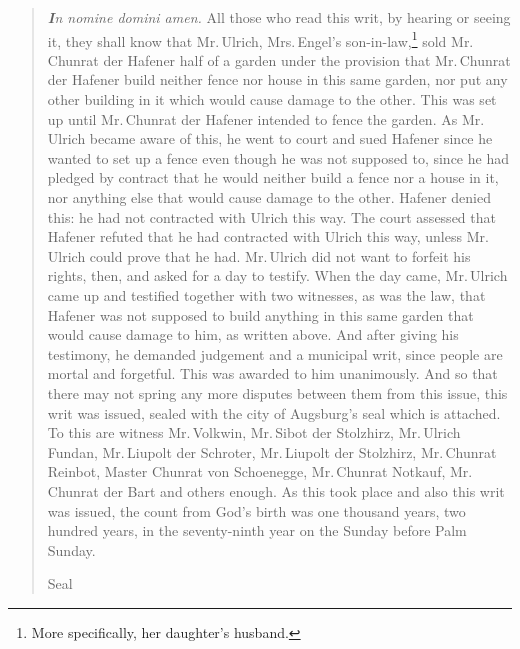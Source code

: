 \documentclass[12pt,paper=a4]{scrartcl}
\begin{document}
\blockquote{\emph{\textbf{I}n nomine domini amen.} All those who read this writ, by hearing or seeing it, they shall know that Mr.\,Ulrich, Mrs.\,Engel's son-in-law,\footnote{More specifically, her daughter's husband.} sold Mr.\,Chunrat der Hafener half of a garden under the provision that Mr.\,Chunrat der Hafener build neither fence nor house in this same garden, nor put any other building in it which would cause damage to the other. This was set up until Mr.\,Chunrat der Hafener intended to fence the garden. As Mr.\,Ulrich became aware of this, he went to court and sued Hafener since he wanted to set up a fence even though he was not supposed to, since he had pledged by contract that he would neither build a fence nor a house in it, nor anything else that would cause damage to the other. Hafener denied this: he had not contracted with Ulrich this way. The court assessed that Hafener refuted that he had contracted with Ulrich this way, unless Mr.\,Ulrich could prove that he had. Mr.\,Ulrich did not want to forfeit his rights, then, and asked for a day to testify. When the day came, Mr.\,Ulrich came up and testified together with two witnesses, as was the law, that Hafener was not supposed to build anything in this same garden that would cause damage to him, as written above. And after giving his testimony, he demanded judgement and a municipal writ, since people are mortal and forgetful. This was awarded to him unanimously. And so that there may not spring any more disputes between them from this issue, this writ was issued, sealed with the city of Augsburg's seal which is attached. To this are witness Mr.\,Volkwin, Mr.\,Sibot der Stolzhirz, Mr.\,Ulrich Fundan, Mr.\,Liupolt der Schroter, Mr.\,Liupolt der Stolzhirz, Mr.\,Chunrat Reinbot, Master Chunrat von Schoenegge, Mr.\,Chunrat Notkauf, Mr.\,Chunrat der Bart and others enough. As this took place and also this writ was issued, the count from God's birth was one thousand years, two hundred years, in the seventy-ninth year on the Sunday before Palm Sunday.

\begin{center}
Seal
\end{center}}


\printbibliography
\end{document}
